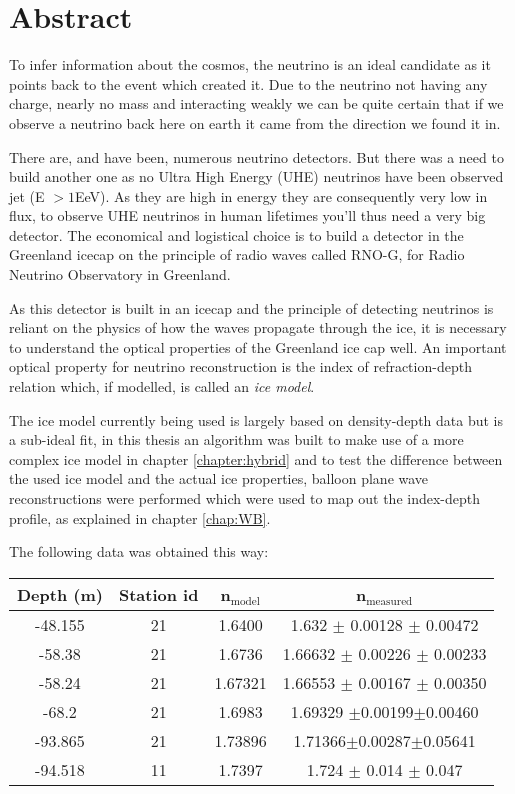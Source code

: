 \chapter*{Abstract}
To infer information about the cosmos, the neutrino is an ideal candidate as it
points back to the event which created it.  Due to the neutrino not having any charge,
nearly no mass and interacting weakly we can be quite certain that if we
observe a neutrino back here on earth it came from the direction we found it in.

There are, and have been, numerous neutrino detectors. But there was a need to
build another one as no Ultra High Energy (UHE) neutrinos have been
observed jet (E $> 1$EeV). As they are high in energy they are consequently very low in flux, to
observe UHE neutrinos in human lifetimes you'll thus need a very big
detector.  The economical and logistical choice is to build a detector in the
Greenland icecap on the principle of radio waves called RNO-G, for
Radio Neutrino Observatory in Greenland.

As this detector is built in an icecap and the principle of detecting neutrinos is reliant
on the physics of how the waves propagate through the ice, it is necessary to understand 
the optical properties of the Greenland ice cap well. An important optical property
for neutrino reconstruction is the index of refraction-depth relation which, if modelled,
is called an \textit{ice model}.

The ice model currently being used is largely based on density-depth data but is 
a sub-ideal fit, in this thesis an algorithm was built to make use of a more complex
ice model in chapter \ref{chapter:hybrid} and to test the difference between the
used ice model and the actual ice properties, balloon plane wave reconstructions were
performed which were used to map out the index-depth profile, as explained in chapter \ref{chap:WB}.

The following data was obtained this way:
\begin{center}
\begin{tabular}{||c c c c||}
 \hline
 Depth (m) & Station id & n$_\text{model}$ & n$_\text{measured}$\\ [0.5ex]
 \hline\hline
 -48.155 & 21 & 1.6400 & 1.632 $\pm$ 0.00128 $\pm$ 0.00472\\
 -58.38 & 21 & 1.6736 & 1.66632 $\pm$ 0.00226 $\pm$ 0.00233 \\
 -58.24 & 21 & 1.67321 & 1.66553 $\pm$ 0.00167 $\pm$ 0.00350 \\
 -68.2 & 21 & 1.6983 & 1.69329 $\pm$0.00199$\pm$0.00460 \\
 -93.865 & 21 & 1.73896 & 1.71366$\pm$0.00287$\pm$0.05641\\
 -94.518 & 11 & 1.7397 & 1.724 $\pm$ 0.014 $\pm$ 0.047 \\
 \hline
\end{tabular}
\end{center}
\newpage
